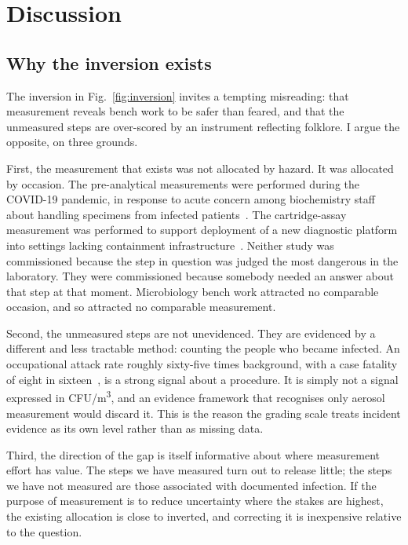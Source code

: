\section{Discussion}

\subsection{Why the inversion exists}
\label{sec:why}

The inversion in Fig.~\ref{fig:inversion} invites a tempting misreading: that measurement
reveals bench work to be safer than feared, and that the unmeasured steps are
over-scored by an instrument reflecting folklore. I argue the opposite, on three grounds.

First, the measurement that exists was not allocated by hazard. It was allocated by
occasion. The pre-analytical measurements were performed during the COVID-19 pandemic, in
response to acute concern among biochemistry staff about handling specimens from infected
patients~\cite{dubuis2021}. The cartridge-assay measurement was performed to support
deployment of a new diagnostic platform into settings lacking containment
infrastructure~\cite{banada2010}. Neither study was commissioned because the step in
question was judged the most dangerous in the laboratory. They were commissioned because
somebody needed an answer about that step at that moment. Microbiology bench work attracted
no comparable occasion, and so attracted no comparable measurement.

Second, the unmeasured steps are not unevidenced. They are evidenced by a different and
less tractable method: counting the people who became infected. An occupational attack
rate roughly sixty-five times background, with a case fatality of eight in
sixteen~\cite{sejvar2005}, is a strong signal about a procedure. It is simply not a signal
expressed in CFU/m\textsuperscript{3}, and an evidence framework that recognises only
aerosol measurement would discard it. This is the reason the grading scale treats incident
evidence as its own level rather than as missing data.

Third, the direction of the gap is itself informative about where measurement effort has
value. The steps we have measured turn out to release little; the steps we have not
measured are those associated with documented infection. If the purpose of measurement is
to reduce uncertainty where the stakes are highest, the existing allocation is close to
inverted, and correcting it is inexpensive relative to the question.

